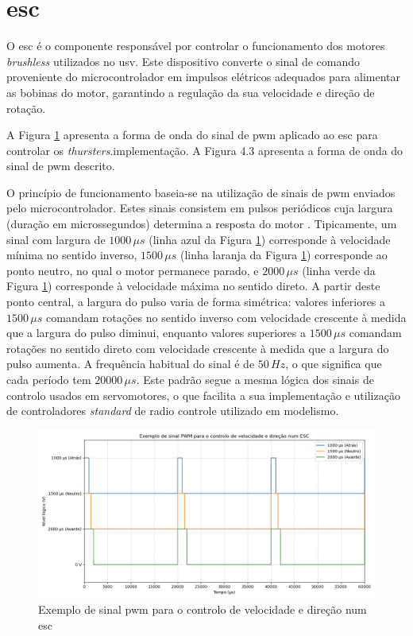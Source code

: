 \section{\acrfull{esc}}
\label{sec:esc}

O \acrfull{esc} é o componente responsável por controlar o funcionamento dos motores \emph{brushless} utilizados no \gls{usv}. Este dispositivo converte o sinal de comando proveniente do microcontrolador em impulsos elétricos adequados para alimentar as bobinas do motor, garantindo a regulação da sua velocidade e direção de rotação.

A Figura \ref{fig:pwm-sinal} apresenta a forma de onda do sinal de \gls{pwm} aplicado ao \gls{esc} para controlar os \emph{thursters}.implementação. A Figura 4.3 apresenta a forma de onda do sinal de \gls{pwm} descrito.

O princípio de funcionamento baseia-se na utilização de sinais de \gls{pwm} enviados pelo microcontrolador. Estes sinais consistem em pulsos periódicos cuja largura (duração em microssegundos) determina a resposta do motor \cite{didactic-robot-thesis}. Tipicamente, um sinal com largura de $1000\,\mu s$ (linha azul da Figura \ref{fig:pwm-sinal}) corresponde à velocidade mínima no sentido inverso, $1500\,\mu s$ (linha laranja da Figura \ref{fig:pwm-sinal}) corresponde ao ponto neutro, no qual o motor permanece parado, e $2000\,\mu s$ (linha verde da Figura \ref{fig:pwm-sinal}) corresponde à velocidade máxima no sentido direto. A partir deste ponto central, a largura do pulso varia de forma simétrica: valores inferiores a $1500\,\mu s$ comandam rotações no sentido inverso com velocidade crescente à medida que a largura do pulso diminui, enquanto valores superiores a $1500\,\mu s$ comandam rotações no sentido direto com velocidade crescente à medida que a largura do pulso aumenta. A frequência habitual do sinal é de $50\,Hz$, o que significa que cada período tem $20000\,\mu s$. Este padrão segue a mesma lógica dos sinais de controlo usados em servomotores, o que facilita a sua implementação e utilização de controladores \emph{standard} de radio controle utilizado em modelismo. 

\begin{figure}[H]
    \centering
    \includegraphics[width=1\linewidth]{figuras/pwm_us.png}
    \caption{Exemplo de sinal \gls{pwm} para o controlo de velocidade e direção num \gls{esc}}
    \label{fig:pwm-sinal}
\end{figure}

